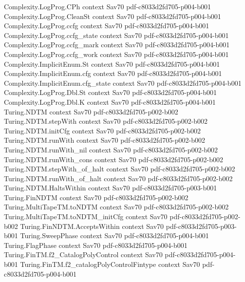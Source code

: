 \begin{theorem}
  {Complexity.LogProg.CPh}
  {context}
  {Sav70}
  {pdf-c8033d2fd705-p004-b001}
\proofstep
  {Complexity.LogProg.CleanSt}
  {context}
  {Sav70}
  {pdf-c8033d2fd705-p004-b001}
\proofstep
  {Complexity.LogProg.ccfg}
  {context}
  {Sav70}
  {pdf-c8033d2fd705-p004-b001}
\proofstep
  {Complexity.LogProg.ccfg_state}
  {context}
  {Sav70}
  {pdf-c8033d2fd705-p004-b001}
\proofstep
  {Complexity.LogProg.ccfg_mark}
  {context}
  {Sav70}
  {pdf-c8033d2fd705-p004-b001}
\proofstep
  {Complexity.LogProg.ccfg_work}
  {context}
  {Sav70}
  {pdf-c8033d2fd705-p004-b001}
\proofstep
  {Complexity.ImplicitEnum.St}
  {context}
  {Sav70}
  {pdf-c8033d2fd705-p004-b001}
\proofstep
  {Complexity.ImplicitEnum.cfg}
  {context}
  {Sav70}
  {pdf-c8033d2fd705-p004-b001}
\proofstep
  {Complexity.ImplicitEnum.cfg_state}
  {context}
  {Sav70}
  {pdf-c8033d2fd705-p004-b001}
\proofstep
  {Complexity.LogProg.Dbl.St}
  {context}
  {Sav70}
  {pdf-c8033d2fd705-p004-b001}
\proofstep
  {Complexity.LogProg.Dbl.K}
  {context}
  {Sav70}
  {pdf-c8033d2fd705-p004-b001}
\proofstep
  {Turing.NDTM}
  {context}
  {Sav70}
  {pdf-c8033d2fd705-p002-b002}
\proofstep
  {Turing.NDTM.stepWith}
  {context}
  {Sav70}
  {pdf-c8033d2fd705-p002-b002}
\proofstep
  {Turing.NDTM.initCfg}
  {context}
  {Sav70}
  {pdf-c8033d2fd705-p002-b002}
\proofstep
  {Turing.NDTM.runWith}
  {context}
  {Sav70}
  {pdf-c8033d2fd705-p002-b002}
\proofstep
  {Turing.NDTM.runWith_nil}
  {context}
  {Sav70}
  {pdf-c8033d2fd705-p002-b002}
\proofstep
  {Turing.NDTM.runWith_cons}
  {context}
  {Sav70}
  {pdf-c8033d2fd705-p002-b002}
\proofstep
  {Turing.NDTM.stepWith_of_halt}
  {context}
  {Sav70}
  {pdf-c8033d2fd705-p002-b002}
\proofstep
  {Turing.NDTM.runWith_of_halt}
  {context}
  {Sav70}
  {pdf-c8033d2fd705-p002-b002}
\proofstep
  {Turing.NDTM.HaltsWithin}
  {context}
  {Sav70}
  {pdf-c8033d2fd705-p003-b001}
\proofstep
  {Turing.FinNDTM}
  {context}
  {Sav70}
  {pdf-c8033d2fd705-p002-b002}
\proofstep
  {Turing.MultiTapeTM.toNDTM}
  {context}
  {Sav70}
  {pdf-c8033d2fd705-p002-b002}
\proofstep
  {Turing.MultiTapeTM.toNDTM_initCfg}
  {context}
  {Sav70}
  {pdf-c8033d2fd705-p002-b002}
\proofstep
  {Turing.FinNDTM.AcceptsWithin}
  {context}
  {Sav70}
  {pdf-c8033d2fd705-p003-b001}
\proofstep
  {Turing.SweepPhase}
  {context}
  {Sav70}
  {pdf-c8033d2fd705-p004-b001}
\proofstep
  {Turing.FlagPhase}
  {context}
  {Sav70}
  {pdf-c8033d2fd705-p004-b001}
\proofstep
  {Turing.FinTM.f2_CatalogPolyControl}
  {context}
  {Sav70}
  {pdf-c8033d2fd705-p004-b001}
\proofstep
  {Turing.FinTM.f2_catalogPolyControlFintype}
  {context}
  {Sav70}
  {pdf-c8033d2fd705-p004-b001}

\end{theorem}
